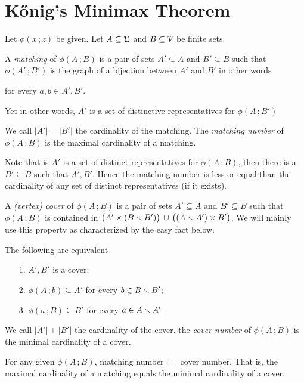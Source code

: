 \documentclass[scombinatorics.tex]{subfiles}
\begin{document}
\section{K\H{o}nig's Minimax Theorem}\label{Konig}

Let $\phi(x\,;z)$ be given. 
Let $A\subseteq\EuScript U$ and $B\subseteq\EuScript V$ be finite sets. 

A \emph{matching\/} of $\phi(A\,;B)$ is a pair of sets $A'\subseteq A$  and $B'\subseteq B$ such that $\phi(A'\,;B')$ is the graph of a bijection between $A'$ and $B'$ in other words

\quad for every $a,b\in A',B'$.

Yet in other words, $A'$ is a set of distinctive representatives for  $\phi(A\,;B')$

We call $|A'|=|B'|$ the cardinality of the matching.
The \emph{matching number} of $\phi(A\,;B)$ is the maximal cardinality of a matching.

Note that is $A'$ is a set of distinct representatives for $\phi(A\,;B)$, then there is a $B'\subseteq B$ such that $A',B'$.
Hence the matching number is less or equal than the cardinality of any set of distinct representatives (if it exists).

A \emph{(vertex) cover\/} of $\phi(A\,;B)$ is a pair of sets $A'\subseteq A$ and $B'\subseteq B$ such that $\phi(A\,;B)$ is contained in $\big(A'\times (B\smallsetminus B')\big)\,\cup\, \big((A\smallsetminus A')\times B'\big)$. We will mainly use this property as characterized by the easy fact below.

\begin{fact}\label{fact_cover}
   The following are equivalent
   \begin{itemize}
      \item[1.] $A',B'$ is a cover;
      \item[2.] $\phi(A\,;b)\subseteq A'$ for every $b\in B\smallsetminus B'$;
      \item[3.] $\phi(a\,;B)\subseteq B'$ for every $a\in A\smallsetminus A'$.\QED
   \end{itemize}
\end{fact}

We call $|A'|+|B'|$ the cardinality of the cover.
the \emph{cover number\/} of $\phi(A\,;B)$ is the minimal cardinality of a cover.


\begin{void_thm}
   For any given  $\phi(A\,;B)$, matching number $=$ cover number.
   That is, the maximal cardinality of a matching equals the minimal cardinality of a cover.
\end{void_thm}
\end{document}
